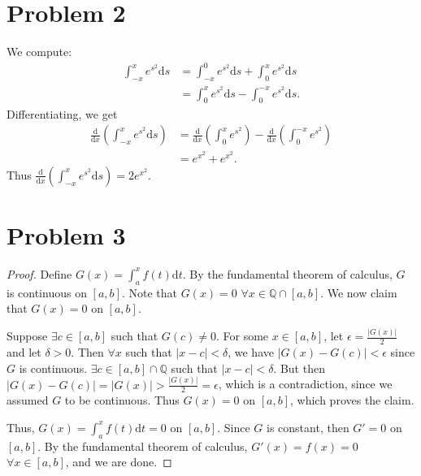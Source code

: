 \documentclass{article}
\newcommand{\Q}{\mathbb{Q}} %
\begin{document}
\section*{Problem 2}
We compute:
\begin{align}
	\int_{-x}^x e^{s^2} \mathrm{d}s &= \int_{-x}^{0}e^{s^2} \mathrm{d}s + \int_{0}^{x}e^{s^2} \mathrm{d}s \\
	&= \int_{0}^{x}e^{s^2} \mathrm{d}s - \int_{0}^{-x}e^{s^2} \mathrm{d}s.
\end{align}
Differentiating, we get
\begin{align}
	\frac{\mathrm{d}}{\mathrm{d}x}\left(\int_{-x}^x e^{s^2} \mathrm{d}s\right) &= \frac{\mathrm{d}}{\mathrm{d}x}\left(\int_{0}^{x}e^{s^2}\right) - \frac{\mathrm{d}}{\mathrm{d}x}\left(\int_{0}^{-x}e^{s^2}\right) \\
	&= e^{x^2} + e^{x^2}.
\end{align}
Thus $\frac{\mathrm{d}}{\mathrm{d}x}\left(\int_{-x}^x e^{s^2} \mathrm{d}s\right) = 2e^{x^2}$.
\section*{Problem 3}
\begin{proof}
	Define $G(x) = \int_a ^x f(t) \mathrm{d}t$. By the fundamental theorem of calculus, $G$ is continuous on $[a, b]$. Note that $G(x) = 0$  $\forall x \in \Q \cap [a, b]$. We now claim that $G(x) = 0$ on $[a, b]$. 
	
	Suppose $\exists c \in [a, b]$ such that $G(c) \neq 0$. For some $x \in [a, b]$, let $\epsilon = \frac{|G(x)|}{2}$ and let $\delta > 0$. Then $\forall x$ such that $|x - c| < \delta$, we have $|G(x) - G(c)| < \epsilon$ since $G$ is continuous. $\exists c \in [a, b] \cap \Q$ such that $|x - c| < \delta$. But then $|G(x) - G(c)| = |G(x)| > \frac{|G(x)|}{2} = \epsilon$, which is a contradiction, since we assumed $G$ to be continuous. Thus $G(x) = 0$ on $[a, b]$, which proves the claim.
	
	Thus, $G(x) = \int_a ^x f(t) \mathrm{d}t = 0$ on $[a, b]$. Since $G$ is constant, then $G' = 0$ on $[a, b]$. By the fundamental theorem of calculus, $G'(x) = f(x) = 0$ $\forall x \in [a, b]$, and we are done.
\end{proof}
\end{document}
